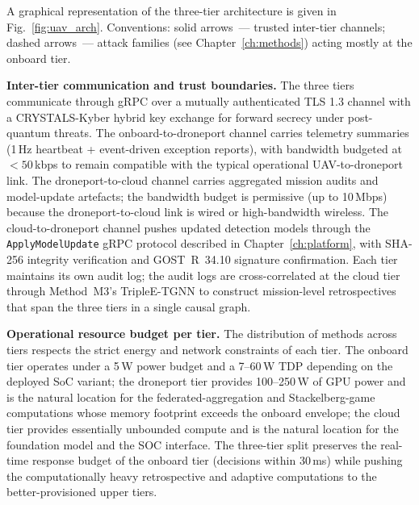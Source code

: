 A graphical representation of the three-tier architecture is given in
Fig.~\ref{fig:uav_arch}. Conventions: solid arrows~--- trusted
inter-tier channels; dashed arrows~--- attack families
(see Chapter~\ref{ch:methods}) acting mostly at the onboard tier.

\noindent\textbf{Inter-tier communication and trust boundaries.}
The three tiers communicate through gRPC over a mutually
authenticated TLS 1.3 channel with a CRYSTALS-Kyber hybrid key
exchange for forward secrecy under post-quantum threats. The
onboard-to-droneport channel carries telemetry summaries (1\,Hz
heartbeat + event-driven exception reports), with bandwidth
budgeted at $<\!50$\,kbps to remain compatible with the typical
operational UAV-to-droneport link. The droneport-to-cloud channel
carries aggregated mission audits and model-update artefacts; the
bandwidth budget is permissive (up to 10\,Mbps) because the
droneport-to-cloud link is wired or high-bandwidth wireless. The
cloud-to-droneport channel pushes updated detection models through
the \texttt{ApplyModelUpdate} gRPC protocol described in
Chapter~\ref{ch:platform}, with SHA-256 integrity verification and
GOST~R~34.10 signature confirmation. Each tier maintains its own
audit log; the audit logs are cross-correlated at the cloud tier
through Method~M3's TripleE-TGNN to construct mission-level
retrospectives that span the three tiers in a single causal graph.

\noindent\textbf{Operational resource budget per tier.} The
distribution of methods across tiers respects the strict energy
and network constraints of each tier. The onboard tier operates
under a 5\,W power budget and a 7--60\,W TDP depending on the
deployed SoC variant; the droneport tier provides 100--250\,W of
GPU power and is the natural location for the federated-aggregation
and Stackelberg-game computations whose memory footprint exceeds
the onboard envelope; the cloud tier provides essentially
unbounded compute and is the natural location for the foundation
model and the SOC interface. The three-tier split preserves the
real-time response budget of the onboard tier (decisions within
30\,ms) while pushing the computationally heavy retrospective and
adaptive computations to the better-provisioned upper tiers.


